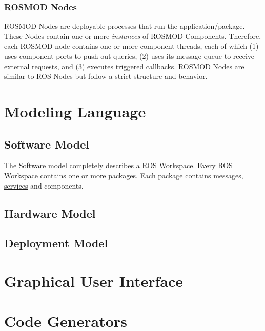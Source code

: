 \documentclass[letterpaper,10pt,english]{sphinxmanual}
\begin{document}
\subsubsection{ROSMOD Nodes}
\label{Introduction:rosmod-nodes}
ROSMOD Nodes are deployable processes that run the application/package. These Nodes contain one or more \emph{instances} of ROSMOD Components. Therefore, each ROSMOD node contains one or more component threads, each of which (1) uses component ports to push out queries, (2) uses its message queue to receive external requests, and (3) executes triggered callbacks. ROSMOD Nodes are similar to ROS Nodes but follow a strict structure and behavior.


\section{Modeling Language}
\label{Modeling_Language:modeling-language}\label{Modeling_Language::doc}

\subsection{Software Model}
\label{Modeling_Language:software-model}
The Software model completely describes a ROS Workspace. Every ROS Workspace contains one or more packages. Each package contains \href{http://wiki.ros.org/Messages}{messages}, \href{http://wiki.ros.org/Services}{services} and components.


\subsection{Hardware Model}
\label{Modeling_Language:hardware-model}

\subsection{Deployment Model}
\label{Modeling_Language:deployment-model}

\section{Graphical User Interface}
\label{Editor::doc}\label{Editor:graphical-user-interface}

\section{Code Generators}
\label{Code_Generators:code-generators}\label{Code_Generators::doc}
\end{document}
